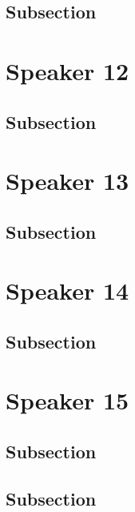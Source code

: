 \documentclass[
]{book}
\begin{document}
\hypertarget{subsection}{%
\section{Subsection}\label{subsection}}

\hypertarget{speaker-12}{%
\chapter*{Speaker 12}\label{speaker-12}}

\hypertarget{subsection}{%
\section{Subsection}\label{subsection}}

\hypertarget{speaker-13}{%
\chapter*{Speaker 13}\label{speaker-13}}

\hypertarget{subsection}{%
\section{Subsection}\label{subsection}}

\hypertarget{speaker-14}{%
\chapter*{Speaker 14}\label{speaker-14}}

\hypertarget{subsection}{%
\section{Subsection}\label{subsection}}

\hypertarget{speaker-15}{%
\chapter*{Speaker 15}\label{speaker-15}}

\hypertarget{subsection}{%
\section{Subsection}\label{subsection}}

\hypertarget{subsection}{%
\section{Subsection}\label{subsection}}
\end{document}
